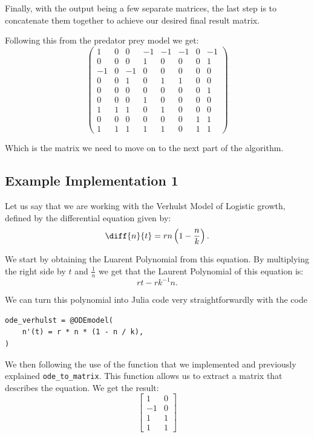 \documentclass[oneside, a4paper, onecolumn, 11pt]{article}
\begin{document}

Finally, with the output being a few separate matrices, the last step is to concatenate them together to achieve our desired final result matrix.

Following this from the predator prey model we get:
\[
    \begin{pmatrix}
        1  & 0 & 0  & -1 & -1 & -1 & 0 & -1 \\
        0  & 0 & 0  & 1  & 0  & 0  & 0 & 1  \\
        -1 & 0 & -1 & 0  & 0  & 0  & 0 & 0  \\
        0  & 0 & 1  & 0  & 1  & 1  & 0 & 0  \\
        0  & 0 & 0  & 0  & 0  & 0  & 0 & 1  \\
        0  & 0 & 0  & 1  & 0  & 0  & 0 & 0  \\
        1  & 1 & 1  & 0  & 1  & 0  & 0 & 0  \\
        0  & 0 & 0  & 0  & 0  & 0  & 1 & 1  \\
        1  & 1 & 1  & 1  & 1  & 0  & 1 & 1
    \end{pmatrix}
\]

Which is the matrix we need to move on to the next part of the algorithm.

\subsection{Example Implementation 1}

Let us say that we are working with the Verhulst Model of Logistic growth, defined by the differential equation given by:
\[
    \diff{n}{t} = rn \left( 1 - \frac{n}{k} \right).
\]

We start by obtaining the Luarent Polynomial from this equation. By multiplying the right side by \(t\) and \(\frac{1}{n}\) we get that the Laurent Polynomial of this equation is:
\[
    r t - r k^{-1} n.
\]

We can turn this polynomial into Julia code very straightforwardly with the code
\begin{lstlisting}
ode_verhulst = @ODEmodel(
    n'(t) = r * n * (1 - n / k),
)
\end{lstlisting}

We then following the use of the function that we implemented and previously explained \texttt{ode\_to\_matrix}. This function allows us to extract a matrix that describes the equation. We get the result:
\[
    \begin{bmatrix}
        1  & 0 \\
        -1 & 0 \\
        1  & 1 \\
        1  & 1
    \end{bmatrix}
\]
\end{document}
